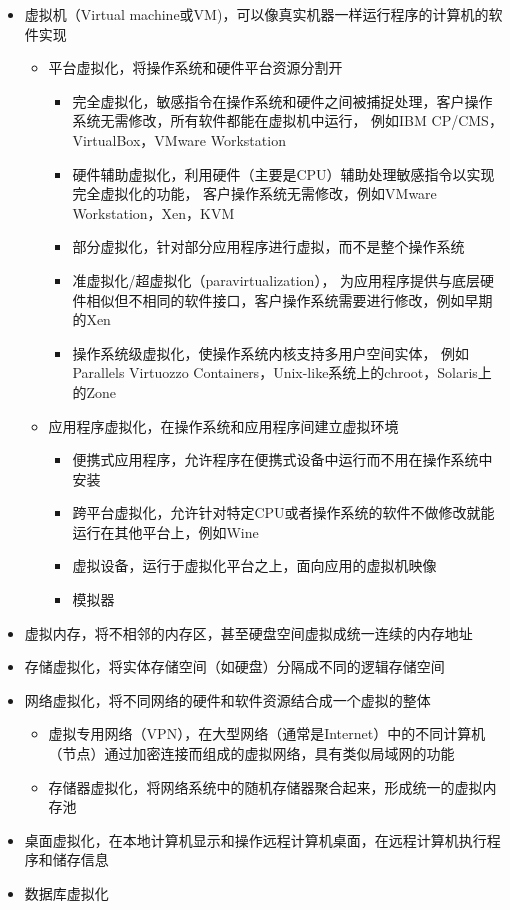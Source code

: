 \begin{itemize}
	\item 虚拟机（Virtual machine或VM)，可以像真实机器一样运行程序的计算机的软件实现
		\begin{itemize}
			\item 平台虚拟化，将操作系统和硬件平台资源分割开
				\begin{itemize}
					\item 完全虚拟化，敏感指令在操作系统和硬件之间被捕捉处理，客户操作系统无需修改，所有软件都能在虚拟机中运行，
						例如IBM CP/CMS，VirtualBox，VMware Workstation
					\item 硬件辅助虚拟化，利用硬件（主要是CPU）辅助处理敏感指令以实现完全虚拟化的功能，
						客户操作系统无需修改，例如VMware Workstation，Xen，KVM
					\item 部分虚拟化，针对部分应用程序进行虚拟，而不是整个操作系统
					\item 准虚拟化/超虚拟化（paravirtualization），
						为应用程序提供与底层硬件相似但不相同的软件接口，客户操作系统需要进行修改，例如早期的Xen
					\item 操作系统级虚拟化，使操作系统内核支持多用户空间实体，
					例如Parallels Virtuozzo Containers，Unix-like系统上的chroot，Solaris上的Zone
				\end{itemize}
			\item 应用程序虚拟化，在操作系统和应用程序间建立虚拟环境
				\begin{itemize}
					\item 便携式应用程序，允许程序在便携式设备中运行而不用在操作系统中安装
					\item 跨平台虚拟化，允许针对特定CPU或者操作系统的软件不做修改就能运行在其他平台上，例如Wine
					\item 虚拟设备，运行于虚拟化平台之上，面向应用的虚拟机映像
					\item 模拟器
				\end{itemize}
	  \end{itemize}
	\item 虚拟内存，将不相邻的内存区，甚至硬盘空间虚拟成统一连续的内存地址
	\item 存储虚拟化，将实体存储空间（如硬盘）分隔成不同的逻辑存储空间
	\item 网络虚拟化，将不同网络的硬件和软件资源结合成一个虚拟的整体
		\begin{itemize}
			\item 虚拟专用网络（VPN），在大型网络（通常是Internet）中的不同计算机（节点）通过加密连接而组成的虚拟网络，具有类似局域网的功能
			\item 存储器虚拟化，将网络系统中的随机存储器聚合起来，形成统一的虚拟内存池
		\end{itemize}
	\item 桌面虚拟化，在本地计算机显示和操作远程计算机桌面，在远程计算机执行程序和储存信息
	\item 数据库虚拟化
\end{itemize}

